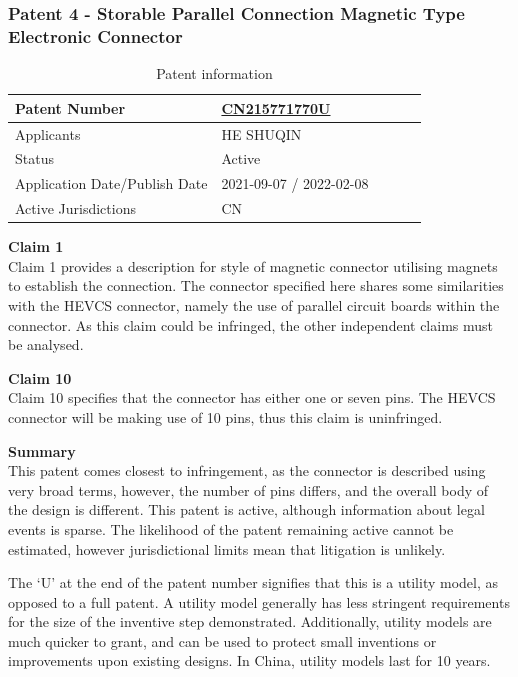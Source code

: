 \documentclass [12pt]{article}
\begin{document}
\subsubsection{Patent 4 - Storable Parallel Connection Magnetic Type Electronic Connector}
\begin{table}[H]
    \centering
    \setlength{\arrayrulewidth}{1.5pt}
    \begin{tabular}{|p{0.5\linewidth}|p{0.5\linewidth}|}
    \hline
    Patent Number & \href{https://worldwide.espacenet.com/patent/search/family/080088809/publication/CN215771770U?q=CN215771770U}{CN215771770U}\\
    \hline
    Applicants &HE SHUQIN\\
    \hline
    Status & Active\\
    \hline
    Application Date/Publish Date & 2021-09-07 / 2022-02-08\\
    \hline
    Active Jurisdictions & CN\\
    \hline
    \end{tabular}
    \caption{Patent information}
    \label{table:mag_con4}
\end{table}
\textbf{Claim 1}\\
Claim 1 provides a description for style of magnetic connector utilising magnets to establish the connection. The connector specified here shares some similarities with the HEVCS connector, namely the use of parallel circuit boards within the connector. As this claim could be infringed, the other independent claims must be analysed.

\textbf{Claim 10}\\
Claim 10 specifies that the connector has either one or seven pins. The HEVCS connector will be making use of 10 pins, thus this claim is uninfringed.

\textbf{Summary}\\
This patent comes closest to infringement, as the connector is described using very broad terms, however, the number of pins differs, and the overall body of the design is different. This patent is active, although information about legal events is sparse. The likelihood of the patent remaining active cannot be estimated, however jurisdictional limits mean that litigation is unlikely.

The ‘U’ at the end of the patent number signifies that this is a utility model, as opposed to a full patent. A utility model generally has less stringent requirements for the size of the inventive step demonstrated. Additionally, utility models are much quicker to grant, and can be used to protect small inventions or improvements upon existing designs. In China, utility models last for 10 years.
\end{document}
